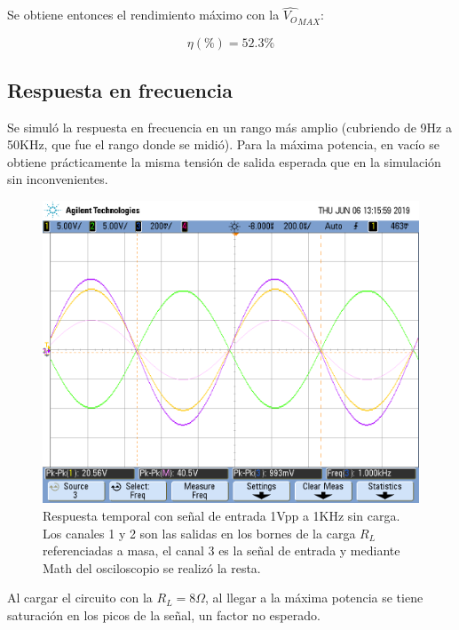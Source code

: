 Se obtiene entonces el rendimiento máximo con la $\hat{V_O}_{MAX}$:

\[
\eta(\%) = 52.3\%
\]

\subsection{Respuesta en frecuencia}

Se simuló la respuesta en frecuencia en un rango más amplio (cubriendo de 9Hz a 50KHz, que fue el rango donde se midió). Para la máxima potencia, en vacío se obtiene prácticamente la misma tensión de salida esperada que en la simulación sin inconvenientes.

\begin{figure}[!ht]
\begin{centering}
\includegraphics[scale=0.4]{Imagenes/feed_ok.png}
\par\end{centering}
\caption{Respuesta temporal con señal de entrada 1Vpp a 1KHz sin carga. Los canales 1 y 2 son las salidas en los bornes de la carga $R_L$ referenciadas a masa, el canal 3 es la señal de entrada y mediante Math del osciloscopio se realizó la resta.}
\end{figure}

\newpage

Al cargar el circuito con la $R_L = 8\Omega$, al llegar a la máxima potencia se tiene saturación en los picos de la señal, un factor no esperado.

